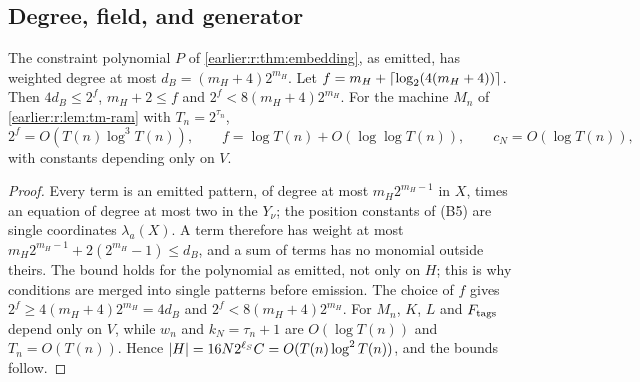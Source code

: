 \subsection{Degree, field, and generator}

\begin{lemma}\label{earlier:r:lem:acsp-degree}
The constraint polynomial \(P\) of \cref{earlier:r:thm:embedding}, as emitted, has
weighted degree at most \(d_B=(m_H+4)2^{m_H}\). Let
\(f=m_H+\left\lceil\log_2(4(m_H+4))\right\rceil\). Then \(4d_B\le2^f\), \(m_H+2\le f\)
and \(2^f<8(m_H+4)2^{m_H}\). For the machine \(M_n\) of
\cref{earlier:r:lem:tm-ram} with \(T_n=2^{\tau_n}\),
\[
 2^f=O(T(n)\log^3T(n)),\qquad f=\log T(n)+O(\log\log T(n)),\qquad
 c_N=O(\log T(n)),
\]
with constants depending only on \(V\).
\end{lemma}
\begin{proof}
Every term is an emitted pattern, of degree at most \(m_H2^{m_H-1}\) in
\(X\), times an equation of degree at most two in the \(Y_\nu\); the
position constants of (B5) are single coordinates \(\lambda_a(X)\). A
term therefore has weight at most
\(m_H2^{m_H-1}+2(2^{m_H}-1)\le d_B\), and a sum of terms has no monomial
outside theirs. The bound holds for the polynomial as emitted, not only
on \(H\); this is why conditions are merged into single patterns before
emission. The choice of \(f\) gives \(2^f\ge4(m_H+4)2^{m_H}=4d_B\) and
\(2^f<8(m_H+4)2^{m_H}\). For \(M_n\), \(K\), \(L\) and \(F_{\rm tags}\)
depend only on \(V\), while \(w_n\) and \(k_N=\tau_n+1\) are
\(O(\log T(n))\) and \(T_n=O(T(n))\). Hence
\(\left|H\right|=16N2^{\ell_S} C=O(T(n)\log^2T(n))\), and the bounds follow.
\end{proof}


